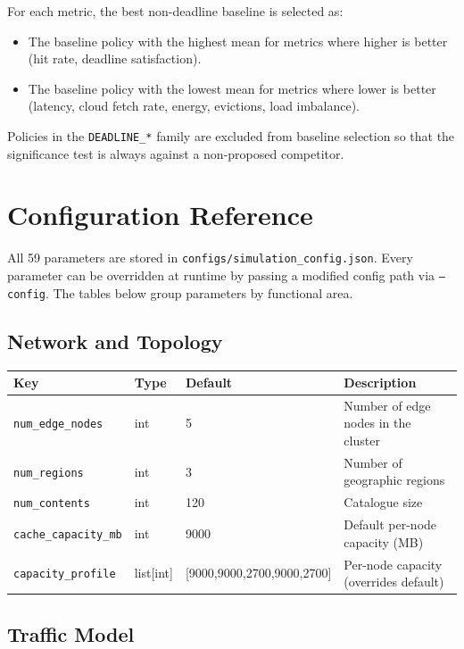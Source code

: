 \documentclass[12pt]{article}
\begin{document}
For each metric, the best non-deadline baseline is selected as:
\begin{itemize}[noitemsep]
  \item The baseline policy with the highest mean for metrics where higher is better (hit rate, deadline satisfaction).
  \item The baseline policy with the lowest mean for metrics where lower is better (latency, cloud fetch rate, energy, evictions, load imbalance).
\end{itemize}

Policies in the \texttt{DEADLINE\_*} family are excluded from baseline selection so that the significance test is always against a non-proposed competitor.

\section{Configuration Reference}
\label{sec:config}

All 59 parameters are stored in \texttt{configs/simulation\_config.json}. Every parameter can be overridden at runtime by passing a modified config path via \texttt{--config}. The tables below group parameters by functional area.

\subsection{Network and Topology}

\begin{tabularx}{\linewidth}{@{}l l l X@{}}
\toprule
\textbf{Key} & \textbf{Type} & \textbf{Default} & \textbf{Description} \\
\midrule
\texttt{num\_edge\_nodes} & int & 5 & Number of edge nodes in the cluster \\
\texttt{num\_regions} & int & 3 & Number of geographic regions \\
\texttt{num\_contents} & int & 120 & Catalogue size \\
\texttt{cache\_capacity\_mb} & int & 9000 & Default per-node capacity (MB) \\
\texttt{capacity\_profile} & list[int] & [9000,9000,2700,9000,2700] & Per-node capacity (overrides default) \\
\bottomrule
\end{tabularx}

\subsection{Traffic Model}
\end{document}
